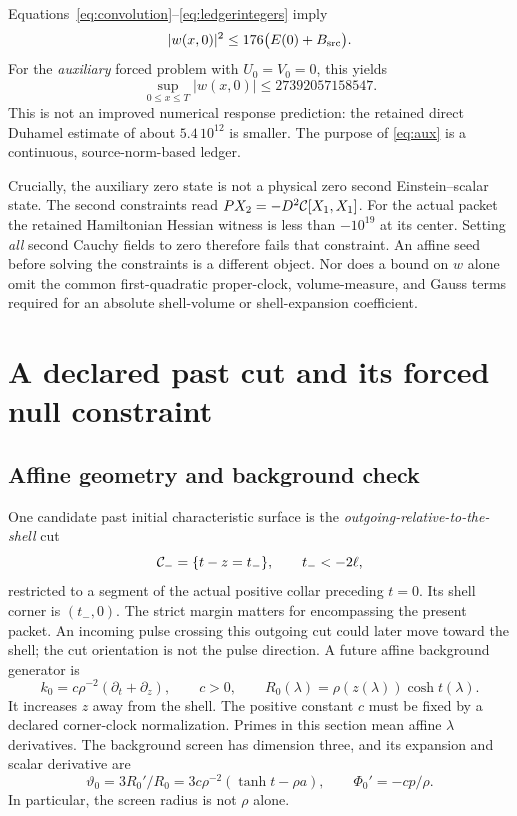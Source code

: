 \documentclass[11pt]{article}
\begin{document}
Equations~\eqref{eq:convolution}--\eqref{eq:ledgerintegers} imply
\begin{equation}
 |w(x,0)|^2\le176\bigl(E(0)+B_{\rm src}\bigr).
 \label{eq:trace}
\end{equation}
For the \emph{auxiliary} forced problem with $U_0=V_0=0$, this yields
\begin{equation}
 \sup_{0\le x\le T}|w(x,0)|\le27392057158547.
 \label{eq:aux}
\end{equation}
This is not an improved numerical response prediction: the retained direct
Duhamel estimate of about $5.4\,10^{12}$ is smaller.
The purpose of \eqref{eq:aux} is a continuous, source-norm-based ledger.

Crucially, the auxiliary zero state is not a physical zero second
Einstein--scalar state. The second constraints read
$P X_2=-D^2{\cal C}[X_1,X_1]$. For the actual packet the retained
Hamiltonian Hessian witness is less than $-10^{19}$ at its center.
Setting \emph{all} second Cauchy fields to zero therefore fails that
constraint. An affine seed before solving the constraints is a different
object. Nor does a bound on $w$ alone omit the common first-quadratic
proper-clock, volume-measure, and Gauss terms required for an absolute
shell-volume or shell-expansion coefficient.

\section{A declared past cut and its forced null constraint}
\label{sec:null}
\subsection{Affine geometry and background check}
One candidate past initial characteristic surface is the
\emph{outgoing-relative-to-the-shell} cut
\begin{equation}
 {\cal C}_-=\{t-z=t_-\},\qquad t_-<-2\ell,
 \label{eq:cut}
\end{equation}
restricted to a segment of the actual positive collar preceding $t=0$.
Its shell corner is $(t_-,0)$. The strict margin matters for encompassing
the present packet. An incoming pulse crossing this outgoing cut could
later move toward the shell; the cut orientation is not the pulse direction.
A future affine background generator is
\begin{equation}
 k_0=c\rho^{-2}(\partial_t+\partial_z),\qquad c>0,
 \qquad R_0(\lambda)=\rho(z(\lambda))\cosh t(\lambda).
 \label{eq:generator}
\end{equation}
It increases $z$ away from the shell. The positive constant $c$ must be fixed
by a declared corner-clock normalization. Primes in this section mean
affine $\lambda$ derivatives. The background screen has dimension three,
and its expansion and scalar derivative are
\begin{equation}
 \vartheta_0=3R_0'/R_0
       =3c\rho^{-2}(\tanh t-\rho a),\qquad
 \Phi_0'=-cp/\rho.
 \label{eq:theta0}
\end{equation}
In particular, the screen radius is not $\rho$ alone.
\end{document}
